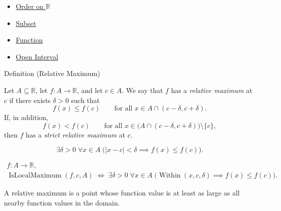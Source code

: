 \begin{dependencies}
\begin{itemize}
  \item \hyperref[def:order-on-r]{Order on $\mathbb{R}$}
  \item \hyperref[def:subset]{Subset}
  \item \hyperref[def:function]{Function}
  \item \hyperref[def:open-interval]{Open Interval}
\end{itemize}
\end{dependencies}

\begin{definitionbox}{Definition (Relative Maximum)}
\begin{definition}
\label{def:relative-maximum}
Let $A \subseteq \mathbb{R}$, let $f : A \to \mathbb{R}$, and let $c \in A$. We say that $f$ has a \emph{relative maximum} at $c$ if there exists $\delta > 0$ such that
\[
f(x) \leq f(c) \qquad \text{for all } x \in A \cap (c-\delta,c+\delta).
\]
If, in addition,
\[
f(x) < f(c) \qquad \text{for all } x \in \bigl(A \cap (c-\delta,c+\delta)\bigr)\setminus\{c\},
\]
then $f$ has a \emph{strict relative maximum} at $c$.
\end{definition}
\end{definitionbox}

\begin{remark*}
\[
\exists \delta > 0\;\forall x \in A\;
\bigl(|x - c| < \delta \implies f(x) \leq f(c)\bigr).
\]
\end{remark*}

\begin{remark*}
\[
\begin{aligned}
  f\colon A\to\mathbb{R},\\
\operatorname{IsLocalMaximum}(f,c,A)
\;\Longleftrightarrow\;
\exists \delta > 0\;\forall x \in A\;
\bigl(\operatorname{Within}(x, c, \delta) \implies f(x) \leq f(c)\bigr).
\end{aligned}
\]
\end{remark*}

\begin{remark*}[Interpretation]
A relative maximum is a point whose function value is at least as large as all nearby function values in the domain.
\end{remark*}

